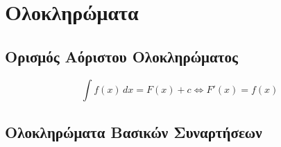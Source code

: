 







\section{Ολοκληρώματα}

\subsection{Ορισμός Αόριστου Ολοκληρώματος}

\[
  \int f(x)\, dx = F(x) + c \Leftrightarrow F'(x) = f(x)
\]

\subsection{Ολοκληρώματα Βασικών Συναρτήσεων}

